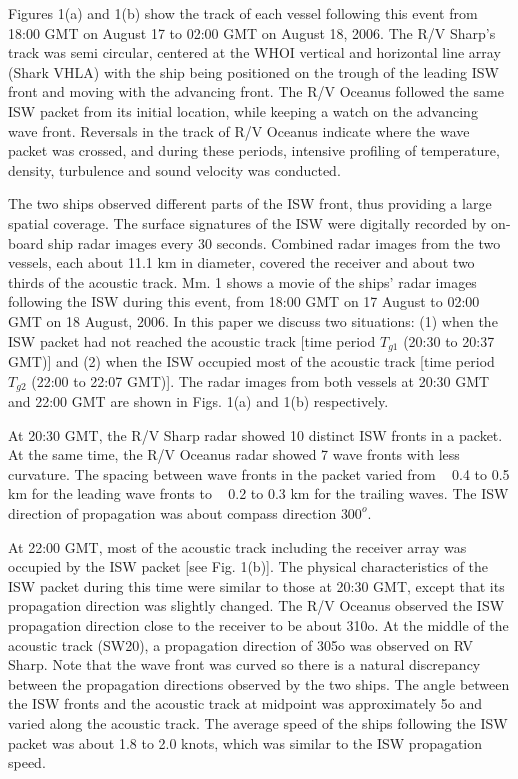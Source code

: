 Figures 1(a) and 1(b) show the track of each vessel following this
event from 18:00 GMT on August 17 to 02:00 GMT on August 18, 2006.
The R/V Sharp's track was semi circular, centered at the WHOI
vertical and horizontal line array (Shark VHLA) with the ship being
positioned on the trough of the leading ISW front and moving with
the advancing front. The R/V Oceanus followed the same ISW packet
from its initial location, while keeping a watch on the advancing
wave front. Reversals in the track of R/V Oceanus indicate where the
wave packet was crossed, and during these periods, intensive
profiling of temperature, density, turbulence and sound velocity was
conducted.

The two ships observed different parts of the ISW front, thus
providing a large spatial coverage. The surface signatures of the
ISW were digitally recorded by on-board ship radar images every 30
seconds. Combined radar images from the two vessels, each about 11.1
km in diameter, covered the receiver and about two thirds of the
acoustic track. Mm. 1 shows a movie of the ships' radar images
following the ISW during this event, from 18:00 GMT on 17 August to
02:00 GMT on 18 August, 2006. In this paper we discuss two
situations: (1) when the ISW packet had not reached the acoustic
track [time period $T_{g1}$ (20:30 to 20:37 GMT)] and (2) when the ISW
occupied most of the acoustic track [time period $T_{g2}$ (22:00 to 22:07
GMT)]. The radar images from both vessels at 20:30 GMT and 22:00 GMT
are shown in Figs. 1(a) and 1(b) respectively.

At 20:30 GMT, the R/V Sharp radar showed 10 distinct ISW fronts in a
packet. At the same time, the R/V Oceanus radar showed 7 wave fronts
with less curvature. The spacing between wave fronts in the packet
varied from ~ 0.4 to 0.5 km for the leading wave fronts to ~ 0.2 to
0.3 km for the trailing waves. The ISW direction of propagation was
about compass direction $300^o$.

At 22:00 GMT, most of the acoustic track including the receiver
array was occupied by the ISW packet [see Fig. 1(b)]. The physical
characteristics of the ISW packet during this time were similar to
those at 20:30 GMT, except that its propagation direction was
slightly changed. The R/V Oceanus observed the ISW propagation
direction close to the receiver to be about 310o. At the middle of
the acoustic track (SW20), a propagation direction of 305o was
observed on RV Sharp. Note that the wave front was curved so there
is a natural discrepancy between the propagation directions observed
by the two ships. The angle between the ISW fronts and the acoustic
track at midpoint was approximately 5o and varied along the acoustic
track. The average speed of the ships following the ISW packet was
about 1.8 to 2.0 knots, which was similar to the ISW propagation
speed.
